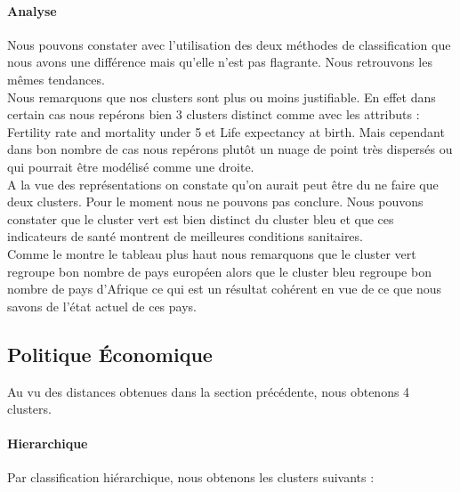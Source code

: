 \paragraph{Analyse}
Nous pouvons constater avec l'utilisation des deux méthodes de classification que nous avons une différence mais qu'elle n'est pas flagrante. Nous retrouvons les mêmes tendances.\\
Nous remarquons que nos clusters sont plus ou moins justifiable. En effet dans certain cas nous repérons bien 3 clusters distinct comme avec les attributs : Fertility rate and mortality under 5 et Life expectancy at birth. Mais cependant dans bon nombre de cas nous repérons plutôt un nuage de point très dispersés ou qui pourrait être modélisé comme une droite.\\
A la vue des représentations on constate qu'on aurait peut être du ne faire que deux clusters. Pour le moment nous ne pouvons pas conclure. Nous pouvons constater que le cluster vert est bien distinct du cluster bleu et que ces indicateurs de santé montrent de meilleures conditions  sanitaires.\\
Comme le montre le tableau plus haut nous remarquons que le cluster vert regroupe bon nombre de pays européen alors que le cluster bleu regroupe bon nombre de pays d'Afrique ce qui est un résultat cohérent en vue de ce que nous savons de l'état actuel de ces pays.


\subsection{Politique Économique}
Au vu des distances obtenues dans la section précédente, nous obtenons 4 clusters.

\paragraph{Hierarchique} Par classification hiérarchique, nous obtenons les clusters suivants :

